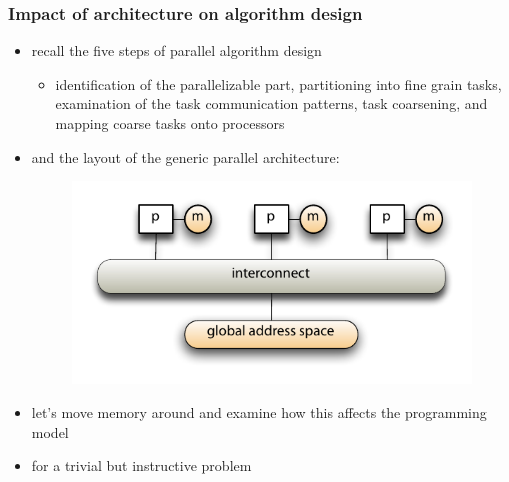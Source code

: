 %
%
%
%


\begin{frame}[fragile]
%
  \frametitle{Impact of architecture on algorithm design}
%
  \begin{itemize}
%
    \item recall the five steps of parallel algorithm design
      \begin{itemize}
      \item identification of the parallelizable part, partitioning into fine grain tasks,
        examination of the task communication patterns, task coarsening, and mapping coarse
        tasks onto processors
      \end{itemize}
%
    \item and the layout of the generic parallel architecture:
%
  \begin{figure}
    \centering
    \includegraphics[width=.70\linewidth]{figures/generic-parallel-architecture.pdf}
    \label{fig:gpa-redux}
  \end{figure}
%
  \item let's move memory around and examine how this affects the programming model
  \item for a trivial but instructive problem
  \end{itemize}
%
\end{frame}

